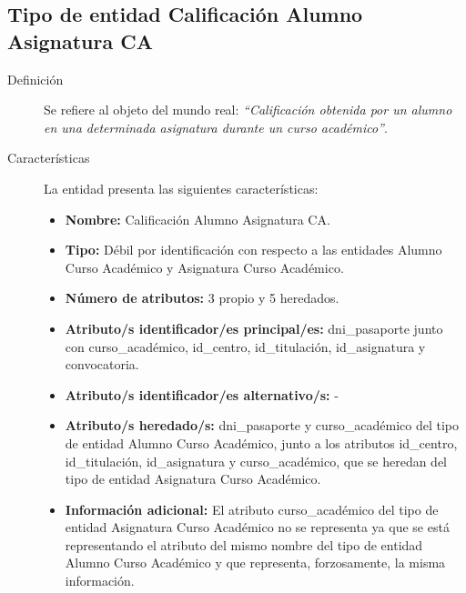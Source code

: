 \subsection{Tipo de entidad Calificación Alumno Asignatura CA}

   \begin{description}

   \item[Definición] Se refiere al objeto del mundo real: \emph{``Calificación
   obtenida por un alumno en una determinada asignatura durante un curso
   académico''}.

   \item[Características] La entidad presenta las siguientes características:
      \begin{itemize}
         \item \textbf{Nombre:} Calificación Alumno Asignatura CA.
         \item \textbf{Tipo:} Débil por identificación con respecto a las
         entidades Alumno Curso Académico y Asignatura Curso Académico.
         \item \textbf{Número de atributos:} 3 propio y 5 heredados.
         \item \textbf{Atributo/s identificador/es principal/es:} dni\_pasaporte
         junto con curso\_académico, id\_centro, id\_titulación, id\_asignatura
         y convocatoria.
         \item \textbf{Atributo/s identificador/es alternativo/s:} -
         \item \textbf{Atributo/s heredado/s:} dni\_pasaporte y curso\_académico
         del tipo de entidad Alumno Curso Académico, junto a los atributos id\_centro,
         id\_titulación, id\_asignatura y curso\_académico, que se heredan del
         tipo de entidad Asignatura Curso Académico.
         \item \textbf{Información adicional:} El atributo curso\_académico del
         tipo de entidad Asignatura Curso Académico no se representa ya que se
         está representando el atributo del mismo nombre del tipo de entidad
         Alumno Curso Académico y que representa, forzosamente, la misma
         información.
      \end{itemize}


\end{description}

